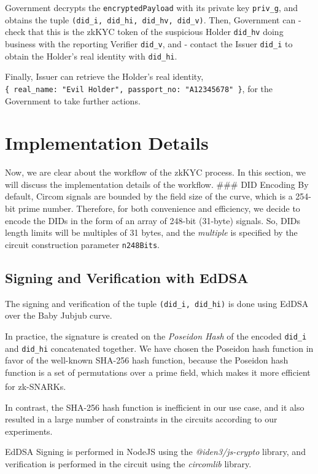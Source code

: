\documentclass[
]{report}
\begin{document}
Government decrypts the \texttt{encryptedPayload} with its private key
\texttt{priv\_g}, and obtains the tuple
\texttt{(did\_i,\ did\_hi,\ did\_hv,\ did\_v)}. Then, Government can -
check that this is the zkKYC token of the suspicious Holder
\texttt{did\_hv} doing business with the reporting Verifier
\texttt{did\_v}, and - contact the Issuer \texttt{did\_i} to obtain the
Holder's real identity with \texttt{did\_hi}.

Finally, Issuer can retrieve the Holder's real identity,
\texttt{\{\ real\_name:\ "Evil\ Holder",\ passport\_no:\ "A12345678"\ \}},
for the Government to take further actions.

\section{Implementation Details}

Now, we are clear about the workflow of the zkKYC process. In this
section, we will discuss the implementation details of the workflow.
\#\#\# DID Encoding By default, Circom signals are bounded by the field
size of the curve, which is a 254-bit prime number. Therefore, for both
convenience and efficiency, we decide to encode the DIDs in the form of
an array of 248-bit (31-byte) signals. So, DIDs length limits will be
multiples of 31 bytes, and the \emph{multiple} is specified by the
circuit construction parameter \texttt{n248Bits}.

\subsection{Signing and Verification with
EdDSA}

The signing and verification of the tuple \texttt{(did\_i,\ did\_hi)} is
done using EdDSA over the Baby Jubjub curve.

In practice, the signature is created on the \emph{Poseidon Hash} of the
encoded \texttt{did\_i} and \texttt{did\_hi} concatenated together. We
have chosen the Poseidon hash function in favor of the well-known
SHA-256 hash function, because the Poseidon hash function is a set of
permutations over a prime field, which makes it more efficient for
zk-SNARKs\textsuperscript{\cite{EIP5988}}.

In contrast, the SHA-256 hash function is inefficient in our use case,
and it also resulted in a large number of constraints in the circuits
according to our experiments.

EdDSA Signing is performed in NodeJS using the \emph{@iden3/js-crypto}
library, and verification is performed in the circuit using the
\emph{circomlib} library.
\end{document}
